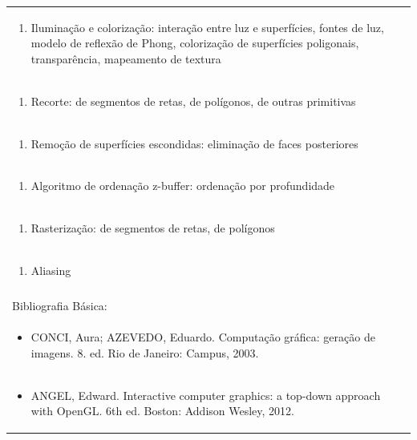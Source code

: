 \documentclass[11pt]{article}
\begin{document}
\begin{center}
\begin{longtable}{|p{4cm}|p{4cm}|p{4cm}|p{4cm}|}
\multicolumn{4}{|p{\dimexpr 16cm + 6\tabcolsep\relax}|}{\begin{enumerate}[start=11]\item Iluminação e colorização: interação entre luz e superfícies, fontes de luz, modelo de reflexão de Phong, colorização de superfícies poligonais, transparência, mapeamento de textura\end{enumerate}}\\
\multicolumn{4}{|p{\dimexpr 16cm + 6\tabcolsep\relax}|}{\begin{enumerate}[start=12]\item Recorte: de segmentos de retas, de polígonos, de outras primitivas\end{enumerate}}\\
\multicolumn{4}{|p{\dimexpr 16cm + 6\tabcolsep\relax}|}{\begin{enumerate}[start=13]\item Remoção de superfícies escondidas: eliminação de faces posteriores\end{enumerate}}\\
\multicolumn{4}{|p{\dimexpr 16cm + 6\tabcolsep\relax}|}{\begin{enumerate}[start=14]\item Algoritmo de ordenação z-buffer: ordenação por profundidade\end{enumerate}}\\
\multicolumn{4}{|p{\dimexpr 16cm + 6\tabcolsep\relax}|}{\begin{enumerate}[start=15]\item Rasterização: de segmentos de retas, de polígonos\end{enumerate}}\\
\multicolumn{4}{|p{\dimexpr 16cm + 6\tabcolsep\relax}|}{\begin{enumerate}[start=16]\item Aliasing\end{enumerate}}\\
\multicolumn{4}{|p{\dimexpr 16cm + 6\tabcolsep\relax}|}{}\\
\hline
\multicolumn{4}{|p{16cm}|}{Bibliografia Básica:}\\*
\multicolumn{4}{|p{\dimexpr 16cm + 6\tabcolsep\relax}|}{\begin{itemize}\item CONCI, Aura; AZEVEDO, Eduardo. Computação gráfica: geração de imagens. 8. ed. Rio de Janeiro: Campus, 2003.\end{itemize}}\\
\multicolumn{4}{|p{\dimexpr 16cm + 6\tabcolsep\relax}|}{\begin{itemize}\item ANGEL, Edward. Interactive computer graphics: a top-down approach with OpenGL. 6th ed. Boston: Addison Wesley, 2012.\end{itemize}}\\

\end{longtable}
\end{center}
\end{document}
